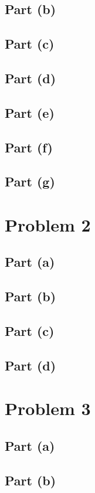 \documentclass[11pt]{article}
\begin{document}
\subsection*{Part (b)}



\subsection*{Part (c)}
\subsection*{Part (d)}
\subsection*{Part (e)}
\subsection*{Part (f)}
\subsection*{Part (g)}
\section*{Problem 2}
\subsection*{Part (a)}
\subsection*{Part (b)}
\subsection*{Part (c)}
\subsection*{Part (d)}
\section*{Problem 3}
\subsection*{Part (a)}
\subsection*{Part (b)}
\end{document}
